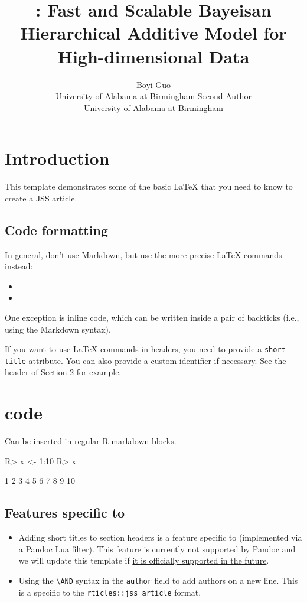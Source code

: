 \documentclass[
]{jss}
\author{
Boyi Guo\\University of Alabama at Birmingham \And Second
Author\\University of Alabama at Birmingham
}
\title{\pkg{BHAM}: Fast and Scalable Bayeisan Hierarchical Additive
Model for High-dimensional Data}
\providecommand{\tightlist}{%
  \setlength{\itemsep}{0pt}\setlength{\parskip}{0pt}}
\begin{document}
\hypertarget{introduction}{%
\section{Introduction}\label{introduction}}

This template demonstrates some of the basic LaTeX that you need to know
to create a JSS article.

\hypertarget{code-formatting}{%
\subsection{Code formatting}\label{code-formatting}}

In general, don't use Markdown, but use the more precise LaTeX commands
instead:

\begin{itemize}
\item
\item
\end{itemize}

One exception is inline code, which can be written inside a pair of
backticks (i.e., using the Markdown syntax).

If you want to use LaTeX commands in headers, you need to provide a
\texttt{short-title} attribute. You can also provide a custom identifier
if necessary. See the header of Section \ref{r-code} for example.

\section[R code]{ code}\label{r-code}

Can be inserted in regular R markdown blocks.

\begin{CodeChunk}
\begin{CodeInput}
R> x <- 1:10
R> x
\end{CodeInput}
\begin{CodeOutput}
 [1]  1  2  3  4  5  6  7  8  9 10
\end{CodeOutput}
\end{CodeChunk}

\subsection[Features specific to rticles]{Features specific to
}\label{features-specific-to}

\begin{itemize}
\tightlist
\item
  Adding short titles to section headers is a feature specific to
   (implemented via a Pandoc Lua filter). This feature is
  currently not supported by Pandoc and we will update this template if
  \href{https://github.com/jgm/pandoc/issues/4409}{it is officially
  supported in the future}.
\item
  Using the \texttt{\textbackslash{}AND} syntax in the \texttt{author}
  field to add authors on a new line. This is a specific to the
  \texttt{rticles::jss\_article} format.
\end{itemize}
\end{document}
